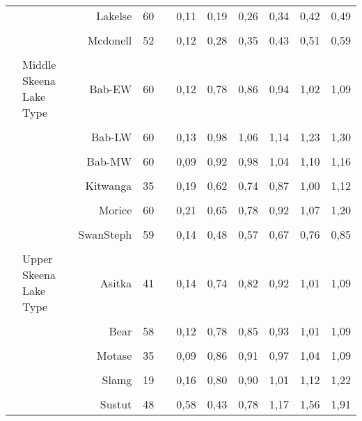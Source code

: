 \documentclass[french,11pt]{book}
\begin{document}
\begin{longtable}[t]{llrr>{}rrrrllr}
\cmidrule(l){3-11}\\  &  & Lakelse & 60 & \cellcolor{cyan}{0,34} & 0,11 & 0,19 & 0,26 & 0,34 & 0,42 & 0,49\\
\cmidrule(l){3-11}\\  &  & Mcdonell & 52 & \cellcolor{cyan}{0,43} & 0,12 & 0,28 & 0,35 & 0,43 & 0,51 & 0,59\\
\cmidrule(l){2-11}\\  & Middle Skeena Lake Type & Bab-EW & 60 & \cellcolor{white}{0,94} & 0,12 & 0,78 & 0,86 & 0,94 & 1,02 & 1,09\\
\cmidrule(l){3-11}\\  &  & Bab-LW & 60 & \cellcolor{orange}{1,14} & 0,13 & 0,98 & 1,06 & 1,14 & 1,23 & 1,30\\
\cmidrule(l){3-11}\\  &  & Bab-MW & 60 & \cellcolor{white}{1,04} & 0,09 & 0,92 & 0,98 & 1,04 & 1,10 & 1,16\\
\cmidrule(l){3-11}\\  &  & Kitwanga & 35 & \cellcolor{cyan}{0,87} & 0,19 & 0,62 & 0,74 & 0,87 & 1,00 & 1,12\\
\cmidrule(l){3-11}\\  &  & Morice & 60 & \cellcolor{white}{0,92} & 0,21 & 0,65 & 0,78 & 0,92 & 1,07 & 1,20\\
\cmidrule(l){3-11}\\  &  & SwanSteph & 59 & \cellcolor{cyan}{0,67} & 0,14 & 0,48 & 0,57 & 0,67 & 0,76 & 0,85\\
\cmidrule(l){2-11}\\  & Upper Skeena Lake Type & Asitka & 41 & \cellcolor{white}{0,92} & 0,14 & 0,74 & 0,82 & 0,92 & 1,01 & 1,09\\
\cmidrule(l){3-11}\\  &  & Bear & 58 & \cellcolor{white}{0,93} & 0,12 & 0,78 & 0,85 & 0,93 & 1,01 & 1,09\\
\cmidrule(l){3-11}\\  &  & Motase & 35 & \cellcolor{white}{0,97} & 0,09 & 0,86 & 0,91 & 0,97 & 1,04 & 1,09\\
\cmidrule(l){3-11}\\  &  & Slamg & 19 & \cellcolor{white}{1,01} & 0,16 & 0,80 & 0,90 & 1,01 & 1,12 & 1,22\\
\cmidrule(l){3-11}\\  &  & Sustut & 48 & \cellcolor{orange}{1,17} & 0,58 & 0,43 & 0,78 & 1,17 & 1,56 & 1,91\\* \end{longtable}
\end{document}
